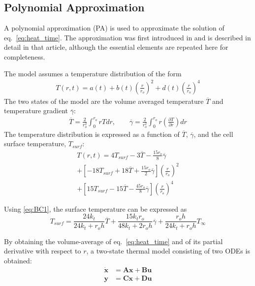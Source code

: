 \documentclass[journal, english]{IEEEtran}
\begin{document}
\subsection{Polynomial Approximation}
A polynomial approximation (PA) is used to approximate the solution of eq.\ \ref{eq:heat_time}. The approximation was first introduced in  \cite{Kim2013} and is described in detail in that article, although the essential elements are repeated
here for completeness.

The model assumes a temperature distribution of the form
\begin{align}
T(r,t)=a(t)+b(t)\left(\frac{r}{r_o}\right)^{2}+d(t)\left(\frac{r}{r_o}\right)^{4}
\end{align}
The two states of the model are the volume averaged temperature $\overline{T}$ and
temperature gradient $\overline{\gamma}$:
\begin{align}
\overline{T}=\frac{2}{r_{o}^{2}}\int_{0}^{r_{o}}rTdr,\qquad
\overline{\gamma}=\frac{2}{r_{o}^{2}}\int_{0}^{r_{o}}r\left(\frac{\partial T}{\partial r}\right)dr\label{eq:Tbar}
\end{align}
The temperature distribution is expressed as a function of $\overline{T}$, $\overline{\gamma}$, and the cell surface temperature, $T_{surf}$:
\begin{multline}
T(r,t)=4T_{surf}-3\overline{T}-\frac{15r_{o}}{8}\overline{\gamma}\\
+\left[-18T_{surf}+18\overline{T}+\frac{15r_{o}}{2}\overline{\gamma}\right]\left(\frac{r}{r_{o}}\right)^{2}\\
+\left[15T_{surf}-15\overline{T}-\frac{45r_{o}}{8}\overline{\gamma}\right]\left(\frac{r}{r_{o}}\right)^{4}\label{eq:T_r_t}
\end{multline}

Using \ref{eq:BC1}, the surface temperature can be expressed as
\begin{equation}
T_{surf}=\frac{24k_{t}}{24k_{t}+r_{o}h}\overline{T}+\frac{15k_{t}r_{o}}{48k_{t}+2r_{o}h}\overline{\gamma}+\frac{r_{o}h}{24k_{t}+r_{o}h}T_{\infty}\label{eq:Ts}
\end{equation}

By obtaining the volume-average of eq.\
\ref{eq:heat_time} and of its partial derivative with respect to
$r$, a two-state thermal model consisting of two ODEs is obtained:
\begin{equation}
\begin{aligned}\mathbf{\dot{x}} & =\mathbf{Ax}+\mathbf{Bu}\\
\mathbf{y} & =\mathbf{Cx}+\mathbf{Du}
\end{aligned}
\label{eq:State-space-model}
\end{equation}
\end{document}
